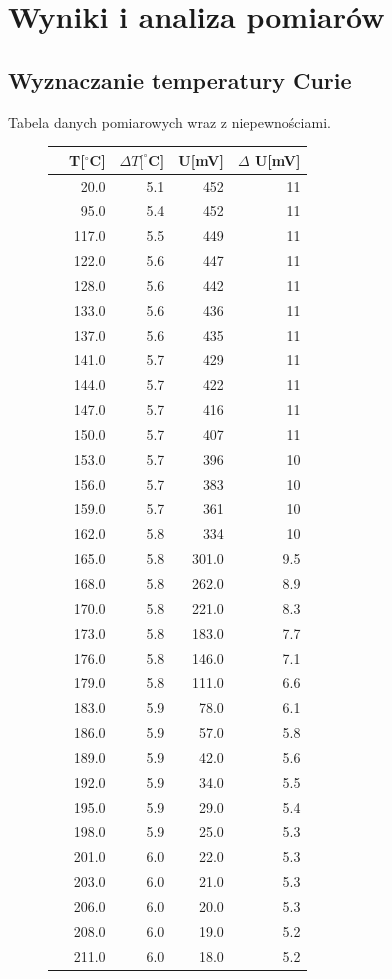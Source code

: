 \documentclass[a4paper,10pt]{article}
\begin{document}
\section{Wyniki i analiza pomiarów}
\subsection{Wyznaczanie temperatury Curie}
Tabela danych pomiarowych wraz z niepewnościami.
\begin{figure}[H]
\begin{tabular}{lrrrr}
\hline
{} &T[$^\circ$C]&$\Delta T[^\circ$C]&U[mV]&$\Delta$ U[mV]\\
\hline
  &   20.0 &  5.1 &  452 &  11 \\
  &   95.0 &  5.4 &  452 &  11 \\
  &  117.0 &  5.5 &  449 &  11 \\
  &  122.0 &  5.6 &  447 &  11 \\
  &  128.0 &  5.6 &  442 &  11 \\
  &  133.0 &  5.6 &  436 &  11 \\
  &  137.0 &  5.6 &  435 &  11 \\
  &  141.0 &  5.7 &  429 &  11 \\
  &  144.0 &  5.7 &  422 &  11 \\
  &  147.0 &  5.7 &  416 &  11 \\
 &  150.0 &  5.7 &  407 &  11 \\
 &  153.0 &  5.7 &  396 &  10 \\
 &  156.0 &  5.7 &  383 &  10 \\
 &  159.0 &  5.7 &  361 &  10 \\
 &  162.0 &  5.8 &  334 &  10 \\
 &  165.0 &  5.8 &  301.0 &   9.5 \\
 &  168.0 &  5.8 &  262.0 &   8.9 \\
 &  170.0 &  5.8 &  221.0 &   8.3 \\
 &  173.0 &  5.8 &  183.0 &   7.7 \\
 &  176.0 &  5.8 &  146.0 &   7.1 \\
 &  179.0 &  5.8 &  111.0 &   6.6 \\
 &  183.0 &  5.9 &   78.0 &   6.1 \\
 &  186.0 &  5.9 &   57.0 &   5.8 \\
 &  189.0 &  5.9 &   42.0 &   5.6 \\
 &  192.0 &  5.9 &   34.0 &   5.5 \\
 &  195.0 &  5.9 &   29.0 &   5.4 \\
 &  198.0 &  5.9 &   25.0 &   5.3 \\
 &  201.0 &  6.0 &   22.0 &   5.3 \\
 &  203.0 &  6.0 &   21.0 &   5.3 \\
 &  206.0 &  6.0 &   20.0 &   5.3 \\
 &  208.0 &  6.0 &   19.0 &   5.2 \\
 &  211.0 &  6.0 &   18.0 &   5.2 \\
\hline
\end{tabular}
\end{figure}
\end{document}
